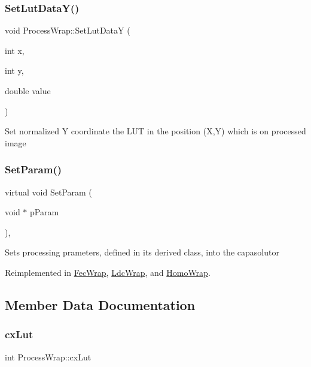 \subsubsection{\texorpdfstring{Set\+Lut\+Data\+Y()}{SetLutDataY()}}
{\footnotesize\ttfamily void Process\+Wrap\+::\+Set\+Lut\+DataY (\begin{DoxyParamCaption}\item[{int}]{x,  }\item[{int}]{y,  }\item[{double}]{value }\end{DoxyParamCaption})\hspace{0.3cm}{\ttfamily [inline]}}

Set normalized Y coordinate the L\+UT in the position (X,Y) which is on processed image \mbox{\label{class_process_wrap_a6c7130837d4713b0462f42cfc25aca98}} 
\subsubsection{\texorpdfstring{Set\+Param()}{SetParam()}}
{\footnotesize\ttfamily virtual void Set\+Param (\begin{DoxyParamCaption}\item[{void $\ast$}]{p\+Param }\end{DoxyParamCaption})\hspace{0.3cm}{\ttfamily [inline]}, {\ttfamily [virtual]}}

Sets processing prameters, defined in its derived class, into the capasolutor 

Reimplemented in \mbox{\hyperlink{class_fec_wrap_a989dbae7d3f292f4e686eee8f19a1ad7}{Fec\+Wrap}}, \mbox{\hyperlink{class_ldc_wrap_a0e99416d80b36d5da0faaa5a11da9ee7}{Ldc\+Wrap}}, and \mbox{\hyperlink{class_homo_wrap_aecc7d5180e979679ad9e41ceaa846d05}{Homo\+Wrap}}.



\subsection{Member Data Documentation}
\mbox{\label{class_process_wrap_aa7b1b1ab80a42889823b0357de5d3c4a}} 
\subsubsection{\texorpdfstring{cx\+Lut}{cxLut}}
{\footnotesize\ttfamily int Process\+Wrap\+::cx\+Lut\hspace{0.3cm}{\ttfamily [protected]}}

